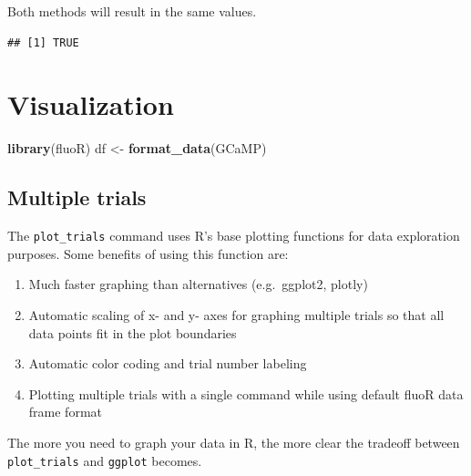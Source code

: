 \documentclass[
]{book}
\newenvironment{Shaded}{\begin{snugshade}}{\end{snugshade}}
\newcommand{\DecValTok}[1]{\textcolor[rgb]{0.00,0.00,0.81}{#1}}
\newcommand{\KeywordTok}[1]{\textcolor[rgb]{0.13,0.29,0.53}{\textbf{#1}}}
\newcommand{\NormalTok}[1]{#1}
\newcommand{\OperatorTok}[1]{\textcolor[rgb]{0.81,0.36,0.00}{\textbf{#1}}}
\newcommand{\StringTok}[1]{\textcolor[rgb]{0.31,0.60,0.02}{#1}}
\providecommand{\tightlist}{%
  \setlength{\itemsep}{0pt}\setlength{\parskip}{0pt}}
\begin{document}
Both methods will result in the same values.

\begin{Shaded}
\end{Shaded}

\begin{verbatim}
## [1] TRUE
\end{verbatim}

\hypertarget{vis}{%
\chapter{Visualization}\label{vis}}

\begin{Shaded}
\begin{Highlighting}[]
\KeywordTok{library}\NormalTok{(fluoR)}
\NormalTok{df <-}\StringTok{ }\KeywordTok{format_data}\NormalTok{(GCaMP)}
\end{Highlighting}
\end{Shaded}

\hypertarget{vis-multiple}{%
\section{Multiple trials}\label{vis-multiple}}

The \texttt{plot\_trials} command uses R's base plotting functions for data exploration purposes. Some benefits of using this function are:

\begin{enumerate}
\def\labelenumi{\arabic{enumi}.}
\tightlist
\item
  Much faster graphing than alternatives (e.g.~ggplot2, plotly)
\item
  Automatic scaling of x- and y- axes for graphing multiple trials so that all data points fit in the plot boundaries
\item
  Automatic color coding and trial number labeling
\item
  Plotting multiple trials with a single command while using default fluoR data frame format
\end{enumerate}

The more you need to graph your data in R, the more clear the tradeoff between \texttt{plot\_trials} and \texttt{ggplot} becomes.
\end{document}
